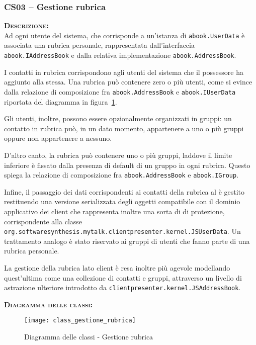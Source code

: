 \subsubsection{CS03 -- Gestione rubrica}
\begin{description}
	\item{\scshape\bfseries Descrizione:}\\
Ad ogni utente del sistema, che corrisponde a un'istanza di \texttt{abook.UserData} è associata una rubrica personale, rappresentata dall'interfaccia \texttt{abook.IAddressBook} e dalla relativa implementazione \texttt{abook.AddressBook}.

I contatti in rubrica corrispondono agli utenti del sistema che il possessore ha aggiunto alla stessa. Una rubrica può contenere zero o più utenti, come si evince dalla relazione di composizione fra \texttt{abook.AddressBook} e \texttt{abook.IUserData} riportata del diagramma in figura~\ref{fig:gestionerubrica}.

Gli utenti, inoltre, possono essere opzionalmente organizzati in gruppi: un contatto in rubrica può, in un dato momento, appartenere a uno o più gruppi oppure non appartenere a nessuno.

D'altro canto, la rubrica può contenere uno o più gruppi, laddove il limite inferiore è fissato dalla presenza di default di un gruppo  in ogni rubrica. Questo spiega la relazione di composizione fra \texttt{abook.AddressBook} e \texttt{abook.IGroup}.

Infine, il passaggio dei dati corrispondenti ai contatti della rubrica al  è gestito restituendo una versione serializzata degli oggetti compatibile con il dominio applicativo dei client che rappresenta inoltre una sorta di  di protezione, corrispondente alla classe \texttt{org.softwaresynthesis.mytalk.clientpresenter.kernel.JSUserData}. Un trattamento analogo è stato riservato ai gruppi di utenti che fanno parte di una rubrica personale.

La gestione della rubrica lato client è resa inoltre più agevole modellando quest'ultima come una collezione di contatti e gruppi, attraverso un livello di astrazione ulteriore introdotto da \texttt{clientpresenter.kernel.JSAddressBook}.

	\item{\scshape\bfseries Diagramma delle classi:}
\begin{figure}[H]
  \centering
  \texttt{[image: class\_gestione\_rubrica]}
  \caption{Diagramma delle classi - Gestione rubrica}\label{fig:gestionerubrica}
\end{figure}
	

\end{description}
